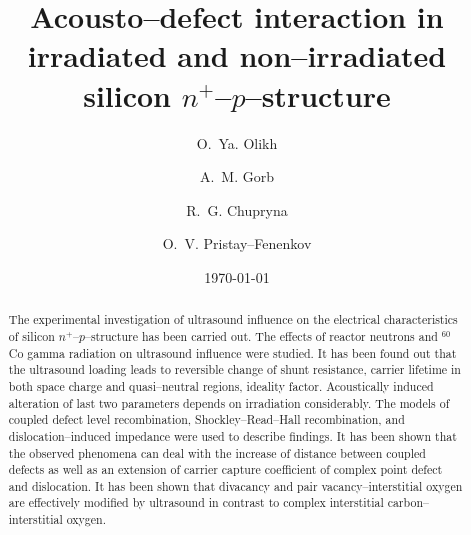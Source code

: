 \documentclass[aip,jap, amsmath,amssymb,reprint]{revtex4-1}
\begin{document}

\title{Acousto--defect interaction in irradiated and non--irradiated silicon $n^+$--$p$--structure}
\author{O.~Ya. Olikh}


\author{A.~M. Gorb}


\author{R.~G. Chupryna}

\author{O.~V. Pristay--Fenenkov}%





\date{\today}

\begin{abstract}
The experimental investigation of ultrasound influence on the electrical characteristics of silicon $n^+$--$p$--structure has been carried out.
The effects of reactor neutrons and $^{60}$Co gamma radiation on ultrasound influence were studied.
It has been found out that the ultrasound loading leads to reversible change of shunt resistance, carrier lifetime in both space charge and quasi--neutral regions, ideality factor.
Acoustically induced alteration of last two parameters depends on irradiation considerably.
The models of coupled defect level recombination, Shockley--Read--Hall recombination, and dislocation--induced impedance were used to describe findings.
It has been shown that the observed phenomena can deal with the increase of distance between coupled defects as well as an extension of carrier capture coefficient of complex point defect and dislocation.
It has been shown that divacancy and pair vacancy--interstitial oxygen are effectively modified by ultrasound in contrast to complex interstitial carbon--interstitial oxygen.
\end{abstract}


\maketitle %
\end{document}
